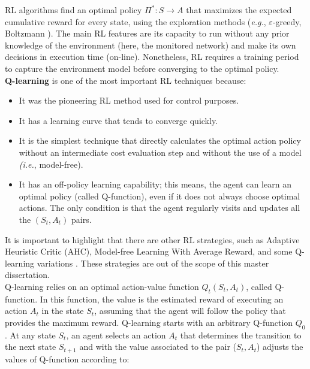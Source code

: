 RL algorithms find an optimal policy $ \Pi^{*}: S \rightarrow A $ that maximizes the expected cumulative reward for every state, using the exploration methods (\textit{e.g.}, $\varepsilon$-greedy, Boltzmann \cite{sutton_1998:rl} \cite{teng_2012:exploration}). The main RL features are its capacity to run without any prior knowledge of the environment (here, the monitored network) and make its own decisions in execution time (on-line). Nonetheless, RL requires a training period to capture the environment model before converging to the optimal policy.\\

\textbf{Q-learning} is one of the most important RL techniques \cite{duryea_2016:exploring_qlearning} because:

\begin{itemize}
    \item It was the pioneering RL method used for control purposes.
    \item It has a learning curve that tends to converge quickly.
    \item It is the simplest technique that directly calculates the optimal action policy without an intermediate cost evaluation step and without the use of a model \textit{(i.e.}, model-free).
    \item It has an off-policy learning capability; this means, the agent can learn an optimal policy (called Q-function), even if it does not always choose optimal actions. The only condition is that the agent regularly visits and updates all the $(S_t, A_t)$ pairs.
\end{itemize}{}

It is important to highlight that there are other RL strategies, such as Adaptive Heuristic Critic (AHC), Model-free Learning With Average Reward, and some Q-learning variations \cite{manju_2011:analysis_ql} \cite{kaelbling_1996:reinforcement}. These strategies are out of the scope of this master dissertation.\\

Q-learning \cite{Watkins:1989:q_learning} \cite{farahnakian_2011:q-learning} relies on an optimal action-value function $ Q_{t}(S_t,A_t)$, called Q-function. In this function, the value is the estimated reward of executing an action $A_t$ in the state $S_t$, assuming that the agent will follow the policy that provides the maximum reward. Q-learning starts with an arbitrary Q-function $Q_{0}$. At any state $S_{t}$, an agent selects an action $A_{t}$ that determines the transition to the next state $S_{t+1}$ and with the value associated to the pair ($S_t,A_t$) adjusts the values of Q-function according to:

